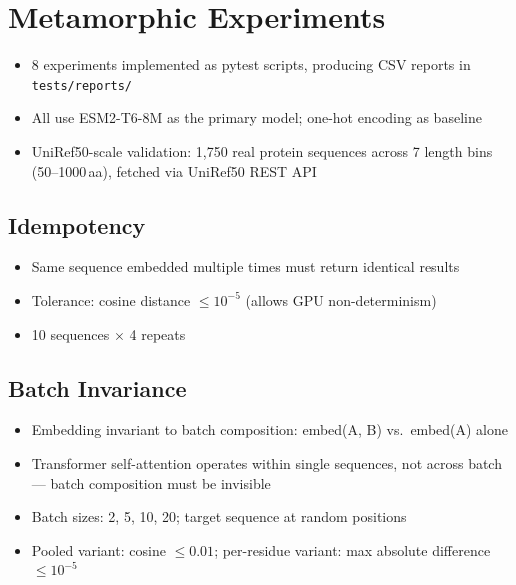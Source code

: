\section{Metamorphic Experiments}\label{sec:metamorphic-experiments}
\begin{itemize}
  \item 8 experiments implemented as pytest scripts, producing CSV reports in \texttt{tests/reports/}
  \item All use ESM2-T6-8M as the primary model; one-hot encoding as baseline
  \item UniRef50-scale validation: 1,750 real protein sequences across 7 length bins (50--1000\,aa), fetched via UniRef50 REST API
\end{itemize}

\subsection{Idempotency}\label{sec:exp-idempotency}
\begin{itemize}
  \item Same sequence embedded multiple times must return identical results
  \item Tolerance: cosine distance $\leq 10^{-5}$ (allows GPU non-determinism)
  \item 10 sequences $\times$ 4 repeats
\end{itemize}

\subsection{Batch Invariance}\label{sec:exp-batch-invariance}
\begin{itemize}
  \item Embedding invariant to batch composition: embed(A, B) vs.\ embed(A) alone
  \item Transformer self-attention operates within single sequences, not across batch --- batch composition must be invisible
  \item Batch sizes: 2, 5, 10, 20; target sequence at random positions
  \item Pooled variant: cosine $\leq 0.01$; per-residue variant: max absolute difference $\leq 10^{-5}$
\end{itemize}

